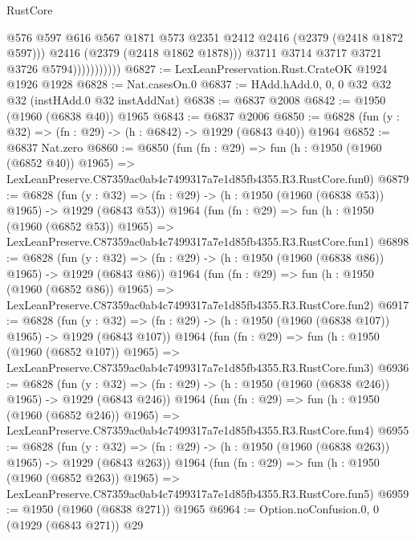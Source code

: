 \begin{lexlean}{RustCore}
\begin{coremodule}
                              @576
                              @597
                              @616
                              @567
                              @1871
                              @573
                              @2351
                              @2412
                              @2416
                              (@2379 (@2418 @1872 @597)))
                            @2416
                            (@2379 (@2418 @1862 @1878)))
                          @3711
                          @3714
                          @3717
                          @3721
                          @3726
                          @5794)))))))))))
@6827 := LexLeanPreservation.Rust.CrateOK @1924 @1926 @1928
@6828 := Nat.casesOn.{0}
@6837 := HAdd.hAdd.{0, 0, 0} @32 @32 @32 (instHAdd.{0} @32 instAddNat)
@6838 := @6837 @2008
@6842 := @1950 (@1960 (@6838 @40)) @1965
@6843 := @6837 @2006
@6850 := @6828 (fun (y : @32) => (fn : @29) -> (h : @6842) -> @1929 (@6843 @40)) @1964
@6852 := @6837 Nat.zero
@6860 := @6850
    (fun (fn : @29) =>
    fun (h : @1950 (@1960 (@6852 @40)) @1965) =>
    LexLeanPreserve.C87359ac0ab4c7499317a7e1d85fb4355.R3.RustCore.fun0)
@6879 := @6828
    (fun (y : @32) => (fn : @29) -> (h : @1950 (@1960 (@6838 @53)) @1965) -> @1929 (@6843 @53))
    @1964
    (fun (fn : @29) =>
    fun (h : @1950 (@1960 (@6852 @53)) @1965) =>
    LexLeanPreserve.C87359ac0ab4c7499317a7e1d85fb4355.R3.RustCore.fun1)
@6898 := @6828
    (fun (y : @32) => (fn : @29) -> (h : @1950 (@1960 (@6838 @86)) @1965) -> @1929 (@6843 @86))
    @1964
    (fun (fn : @29) =>
    fun (h : @1950 (@1960 (@6852 @86)) @1965) =>
    LexLeanPreserve.C87359ac0ab4c7499317a7e1d85fb4355.R3.RustCore.fun2)
@6917 := @6828
    (fun (y : @32) => (fn : @29) -> (h : @1950 (@1960 (@6838 @107)) @1965) -> @1929 (@6843 @107))
    @1964
    (fun (fn : @29) =>
    fun (h : @1950 (@1960 (@6852 @107)) @1965) =>
    LexLeanPreserve.C87359ac0ab4c7499317a7e1d85fb4355.R3.RustCore.fun3)
@6936 := @6828
    (fun (y : @32) => (fn : @29) -> (h : @1950 (@1960 (@6838 @246)) @1965) -> @1929 (@6843 @246))
    @1964
    (fun (fn : @29) =>
    fun (h : @1950 (@1960 (@6852 @246)) @1965) =>
    LexLeanPreserve.C87359ac0ab4c7499317a7e1d85fb4355.R3.RustCore.fun4)
@6955 := @6828
    (fun (y : @32) => (fn : @29) -> (h : @1950 (@1960 (@6838 @263)) @1965) -> @1929 (@6843 @263))
    @1964
    (fun (fn : @29) =>
    fun (h : @1950 (@1960 (@6852 @263)) @1965) =>
    LexLeanPreserve.C87359ac0ab4c7499317a7e1d85fb4355.R3.RustCore.fun5)
@6959 := @1950 (@1960 (@6838 @271)) @1965
@6964 := Option.noConfusion.{0, 0} (@1929 (@6843 @271)) @29

\end{coremodule}
\end{lexlean}
